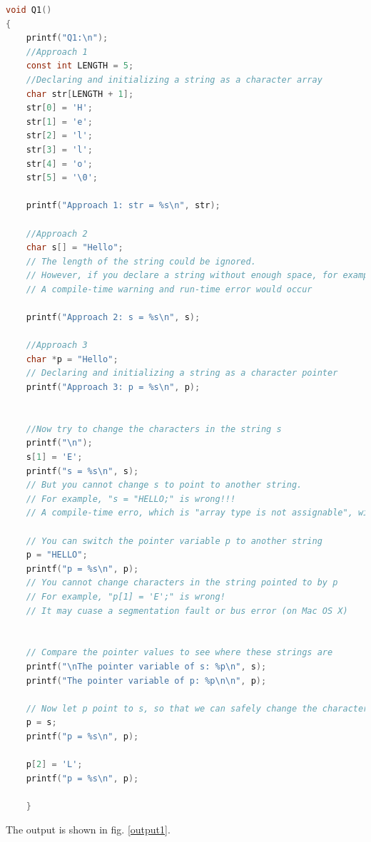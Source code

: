 \documentclass[12pt]{article}
\begin{document}
\begin{lstlisting}[language=C, caption=Solution 1]
void Q1()
{
    printf("Q1:\n");
    //Approach 1
	const int LENGTH = 5; 
    //Declaring and initializing a string as a character array
    char str[LENGTH + 1];
    str[0] = 'H';
    str[1] = 'e';
    str[2] = 'l';
    str[3] = 'l';
    str[4] = 'o';
    str[5] = '\0';
    
    printf("Approach 1: str = %s\n", str);
    
    //Approach 2
    char s[] = "Hello";
    // The length of the string could be ignored.
    // However, if you declare a string without enough space, for example "char s[4] = "Hello";"
    // A compile-time warning and run-time error would occur
    
    printf("Approach 2: s = %s\n", s);
    
    //Approach 3
    char *p = "Hello";
    // Declaring and initializing a string as a character pointer
    printf("Approach 3: p = %s\n", p);
    
    
    //Now try to change the characters in the string s
    printf("\n");
    s[1] = 'E';
    printf("s = %s\n", s);
    // But you cannot change s to point to another string. 
    // For example, "s = "HELLO;" is wrong!!!
    // A compile-time erro, which is "array type is not assignable", will occur
    
    // You can switch the pointer variable p to another string
    p = "HELLO";
    printf("p = %s\n", p);
    // You cannot change characters in the string pointed to by p
    // For example, "p[1] = 'E';" is wrong!
    // It may cuase a segmentation fault or bus error (on Mac OS X)
    
    
    // Compare the pointer values to see where these strings are
    printf("\nThe pointer variable of s: %p\n", s);
    printf("The pointer variable of p: %p\n\n", p);
    
    // Now let p point to s, so that we can safely change the characters
    p = s;
    printf("p = %s\n", p);
    
    p[2] = 'L';
    printf("p = %s\n", p);
    
    }
\end{lstlisting}
The output is shown in fig. \ref{output1}.
\end{document}
